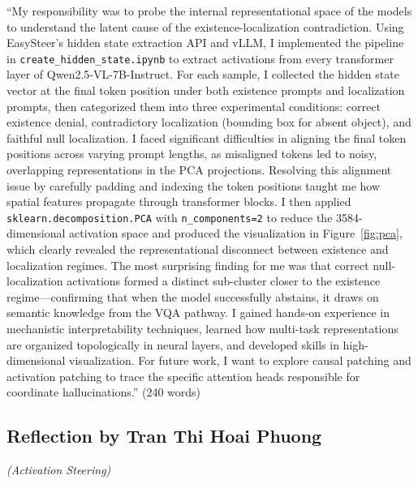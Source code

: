 \documentclass[12pt,a4paper]{article}
\begin{document}
``My responsibility was to probe the internal representational space of the models to understand the latent cause of the existence-localization contradiction. Using EasySteer's hidden state extraction API and vLLM, I implemented the pipeline in \texttt{create\_hidden\_state.ipynb} to extract activations from every transformer layer of Qwen2.5-VL-7B-Instruct. For each sample, I collected the hidden state vector at the final token position under both existence prompts and localization prompts, then categorized them into three experimental conditions: correct existence denial, contradictory localization (bounding box for absent object), and faithful null localization. I faced significant difficulties in aligning the final token positions across varying prompt lengths, as misaligned tokens led to noisy, overlapping representations in the PCA projections. Resolving this alignment issue by carefully padding and indexing the token positions taught me how spatial features propagate through transformer blocks. I then applied \texttt{sklearn.decomposition.PCA} with \texttt{n\_components=2} to reduce the 3584-dimensional activation space and produced the visualization in Figure~\ref{fig:pca}, which clearly revealed the representational disconnect between existence and localization regimes. The most surprising finding for me was that correct null-localization activations formed a distinct sub-cluster closer to the existence regime---confirming that when the model successfully abstains, it draws on semantic knowledge from the VQA pathway. I gained hands-on experience in mechanistic interpretability techniques, learned how multi-task representations are organized topologically in neural layers, and developed skills in high-dimensional visualization. For future work, I want to explore causal patching and activation patching to trace the specific attention heads responsible for coordinate hallucinations.'' (240 words)

\subsection{Reflection by Tran Thi Hoai Phuong}
\textit{(Activation Steering)}
\end{document}
